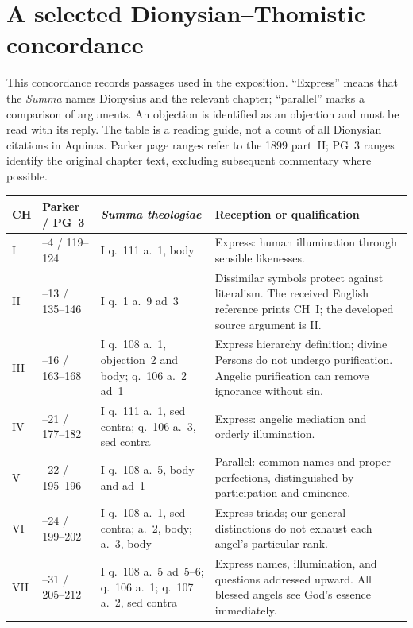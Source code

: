 \section{A selected Dionysian--Thomistic concordance}
\label{app:dionysian-concordance}

This concordance records passages used in the exposition. ``Express'' means that the \emph{Summa} names Dionysius and the relevant chapter; ``parallel'' marks a comparison of arguments. An objection is identified as an objection and must be read with its reply. The table is a reading guide, not a count of all Dionysian citations in Aquinas. Parker page ranges refer to the 1899 part~II; PG~3 ranges identify the original chapter text, excluding subsequent commentary where possible.

\begingroup
\small
\setlength{\tabcolsep}{4pt}
\begin{longtable}{@{}>{\raggedright\arraybackslash}p{.06\linewidth}>{\raggedright\arraybackslash}p{.17\linewidth}>{\raggedright\arraybackslash}p{.32\linewidth}>{\raggedright\arraybackslash}p{.38\linewidth}@{}}
\toprule
CH & Parker / PG~3 & \emph{Summa theologiae} & Reception or qualification \\
\midrule
\endhead
I & 1--4 / 119--124 & I q.~111 a.~1, body & Express: human illumination through sensible likenesses. \\
II & 4--13 / 135--146 & I q.~1 a.~9 ad~3 & Dissimilar symbols protect against literalism. The received English reference prints CH~I; the developed source argument is II. \\
III & 13--16 / 163--168 & I q.~108 a.~1, objection~2 and body; q.~106 a.~2 ad~1 & Express hierarchy definition; divine Persons do not undergo purification. Angelic purification can remove ignorance without sin. \\
IV & 16--21 / 177--182 & I q.~111 a.~1, sed contra; q.~106 a.~3, sed contra & Express: angelic mediation and orderly illumination. \\
V & 21--22 / 195--196 & I q.~108 a.~5, body and ad~1 & Parallel: common names and proper perfections, distinguished by participation and eminence. \\
VI & 23--24 / 199--202 & I q.~108 a.~1, sed contra; a.~2, body; a.~3, body & Express triads; our general distinctions do not exhaust each angel's particular rank. \\
VII & 24--31 / 205--212 & I q.~108 a.~5 ad~5--6; q.~106 a.~1; q.~107 a.~2, sed contra & Express names, illumination, and questions addressed upward. All blessed angels see God's essence immediately. \\

\end{longtable}
